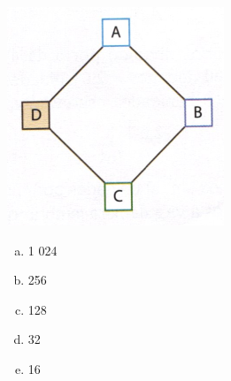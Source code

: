 \documentclass[a4paper,14pt]{article}
\begin{document}
\begin{multicols}{2}
\begin{enumerate}
   			\includegraphics[width=1\linewidth]{6FMA74_imagens/imagem1}
   			\begin{enumerate}[a)]
   				\item 1 024
   				\item 256
   				\item 128
   				\item 32
   				\item 16 \newpage
   			\end{enumerate} 

\end{enumerate}
\end{multicols}
\end{document}
